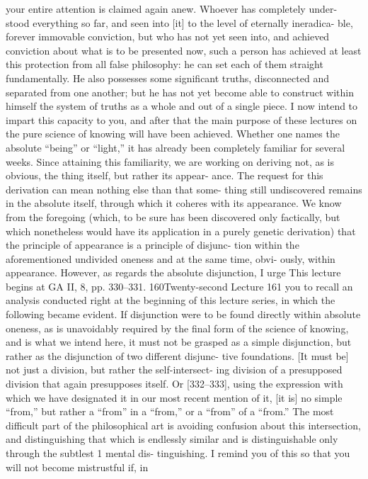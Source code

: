 your entire attention is claimed again anew. Whoever has completely under-
stood everything so far, and seen into [it] to the level of eternally ineradica-
ble, forever immovable conviction, but who has not yet seen into, and achieved
conviction about what is to be presented now, such a person has achieved at
least this protection from all false philosophy: he can set each of them straight
fundamentally. He also possesses some significant truths, disconnected and
separated from one another; but he has not yet become able to construct
within himself the system of truths as a whole and out of a single piece. I now
intend to impart this capacity to you, and after that the main purpose of these
lectures on the pure science of knowing will have been achieved.
Whether one names the absolute “being” or “light,” it has already been
completely familiar for several weeks. Since attaining this familiarity, we are
working on deriving not, as is obvious, the thing itself, but rather its appear-
ance. The request for this derivation can mean nothing else than that some-
thing still undiscovered remains in the absolute itself, through which it
coheres with its appearance.
We know from the foregoing (which, to be sure has been discovered
only factically, but which nonetheless would have its application in a purely
genetic derivation) that the principle of appearance is a principle of disjunc-
tion within the aforementioned undivided oneness and at the same time, obvi-
ously, within appearance. However, as regards the absolute disjunction, I urge
This lecture begins at GA II, 8, pp. 330–331.
160Twenty-second Lecture
161
you to recall an analysis conducted right at the beginning of this lecture series,
in which the following became evident. If disjunction were to be found
directly within absolute oneness, as is unavoidably required by the final form
of the science of knowing, and is what we intend here, it must not be grasped
as a simple disjunction, but rather as the disjunction of two different disjunc-
tive foundations. [It must be] not just a division, but rather the self-intersect-
ing division of a presupposed division that again presupposes itself. Or
[332–333], using the expression with which we have designated it in our most
recent mention of it, [it is] no simple “from,” but rather a “from” in a “from,”
or a “from” of a “from.” The most difficult part of the philosophical art is
avoiding confusion about this intersection, and distinguishing that which is
endlessly similar and is distinguishable only through the subtlest 1 mental dis-
tinguishing. I remind you of this so that you will not become mistrustful if, in
